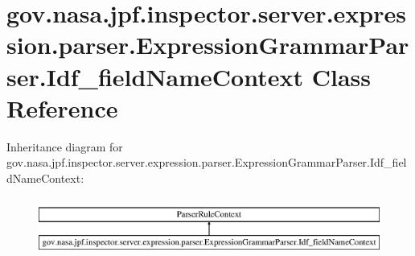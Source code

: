 \hypertarget{classgov_1_1nasa_1_1jpf_1_1inspector_1_1server_1_1expression_1_1parser_1_1_expression_grammar_pad53202cd69742416986508e382be2265}{}\section{gov.\+nasa.\+jpf.\+inspector.\+server.\+expression.\+parser.\+Expression\+Grammar\+Parser.\+Idf\+\_\+field\+Name\+Context Class Reference}
\label{classgov_1_1nasa_1_1jpf_1_1inspector_1_1server_1_1expression_1_1parser_1_1_expression_grammar_pad53202cd69742416986508e382be2265}
Inheritance diagram for gov.\+nasa.\+jpf.\+inspector.\+server.\+expression.\+parser.\+Expression\+Grammar\+Parser.\+Idf\+\_\+field\+Name\+Context\+:\begin{figure}[H]
\begin{center}
\leavevmode
\includegraphics[height=1.961471cm]{classgov_1_1nasa_1_1jpf_1_1inspector_1_1server_1_1expression_1_1parser_1_1_expression_grammar_pad53202cd69742416986508e382be2265}
\end{center}
\end{figure}
